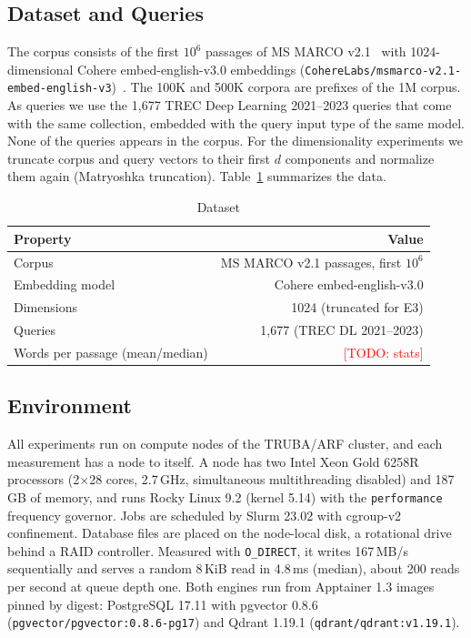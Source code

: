\documentclass[sigconf, nonacm]{acmart}
\newcommand{\todo}[1]{\textcolor{red}{[TODO: #1]}}
\newcommand{\todo}[1]{\errmessage{Unresolved TODO: #1}}
\begin{document}
\subsection{Dataset and Queries}

The corpus consists of the first $10^6$ passages of MS MARCO v2.1~\cite{msmarco} with
1024-dimensional Cohere embed-english-v3.0 embeddings
(\texttt{CohereLabs/msmarco-v2.1-embed-english-v3})~\cite{cohere2024}. The 100K and 500K
corpora are prefixes of the 1M corpus. As queries we use the 1{,}677 TREC Deep Learning
2021--2023 queries that come with the same collection, embedded with the query input
type of the same model. None of the queries appears in the corpus. For the
dimensionality experiments we truncate corpus and query vectors to their first $d$
components and normalize them again (Matryoshka truncation). Table~\ref{tab:dataset}
summarizes the data.

\begin{table}[h]
  \caption{Dataset}
  \label{tab:dataset}
  \small
  \begin{tabular}{lr}
    \toprule
    Property & Value \\
    \midrule
    Corpus & MS MARCO v2.1 passages, first $10^6$ \\
    Embedding model & Cohere embed-english-v3.0 \\
    Dimensions & 1024 (truncated for E3) \\
    Queries & 1{,}677 (TREC DL 2021--2023) \\
    Words per passage (mean/median) & \todo{stats} \\
    \bottomrule
  \end{tabular}
\end{table}

\subsection{Environment}

All experiments run on compute nodes of the TRUBA/ARF cluster, and each measurement has
a node to itself. A node has two Intel Xeon Gold 6258R processors (2$\times$28 cores,
2.7\,GHz, simultaneous multithreading disabled) and 187\,GB of memory, and runs Rocky
Linux 9.2 (kernel 5.14) with the \texttt{performance} frequency governor. Jobs are
scheduled by Slurm 23.02 with cgroup-v2 confinement. Database files are placed on the
node-local disk, a rotational drive behind a RAID controller. Measured with
\texttt{O\_DIRECT}, it writes 167\,MB/s sequentially and serves a random 8\,KiB read in
4.8\,ms (median), about 200 reads per second at queue depth one. Both engines run from Apptainer 1.3 images pinned by digest:
PostgreSQL 17.11 with pgvector 0.8.6 (\texttt{pgvector/pgvector:0.8.6-pg17}) and Qdrant
1.19.1 (\texttt{qdrant/qdrant:v1.19.1}).
\end{document}
